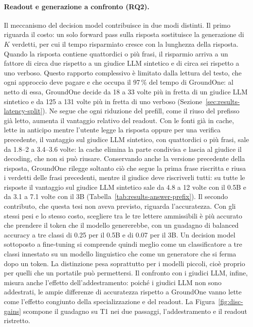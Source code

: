 \paragraph{Readout e generazione a confronto (RQ2).} Il meccanismo del decision model contribuisce in due modi distinti. Il primo
riguarda il costo: un solo forward pass sulla risposta sostituisce la generazione di $K$ verdetti, per cui il tempo
risparmiato cresce con la lunghezza della risposta. Quando la risposta contiene quattordici o più frasi, il risparmio
arriva a un fattore di circa due rispetto a un giudice LLM sintetico e di circa sei rispetto a uno verboso. Questo
rapporto complessivo è limitato dalla lettura del testo, che ogni approccio deve pagare e che occupa il 97\,\% del tempo
di GroundOne: al netto di essa, GroundOne decide da 18 a 33 volte più in fretta di un giudice LLM sintetico e da 125 a 131 volte più in fretta di uno verboso (Sezione~\ref{sec:results-latency-split}). Ne segue che ogni riduzione del
prefill, come il riuso del prefisso già letto, aumenta il vantaggio relativo del readout. Con le fonti già in cache, lette in anticipo mentre l'utente legge la risposta oppure per una verifica precedente, il vantaggio sul giudice LLM sintetico, con quattordici o più frasi, sale da 1.8--2 a 3.4--3.6 volte: la cache elimina la parte condivisa e lascia al giudice il decoding, che non si può riusare. Conservando anche la versione precedente della risposta, GroundOne rilegge soltanto ciò che segue la prima frase riscritta e riusa i verdetti delle frasi precedenti, mentre il giudice deve riscriverli tutti: su tutte le risposte il vantaggio sul giudice LLM sintetico sale da 4.8 a 12 volte con il 0.5B e da 3.1 a 7.1 volte con il 3B (Tabella~\ref{tab:results-answer-prefix}).
Il secondo
contributo, che questa tesi non aveva previsto, riguarda l'accuratezza. Con gli stessi pesi e lo stesso costo, scegliere
tra le tre lettere ammissibili è più accurato che prendere il token che il modello genererebbe, con un guadagno di
balanced accuracy a tre classi di 0.25 per il 0.5B e di 0.07 per il 3B. Un decision model sottoposto a fine-tuning si
comprende quindi meglio come un classificatore a tre classi innestato su un modello linguistico che come un generatore
che si ferma dopo un token. La distinzione pesa soprattutto per i modelli piccoli, cioè proprio per quelli che un
portatile può permettersi. Il confronto con i giudici LLM, infine, misura anche l'effetto dell'addestramento:
poiché i giudici LLM non sono addestrati, le ampie differenze di accuratezza rispetto a GroundOne vanno lette come l'effetto
congiunto della specializzazione e del readout. La Figura~\ref{fig:disc-gains} scompone il guadagno su T1 nei due passaggi, l'addestramento e il readout ristretto.

